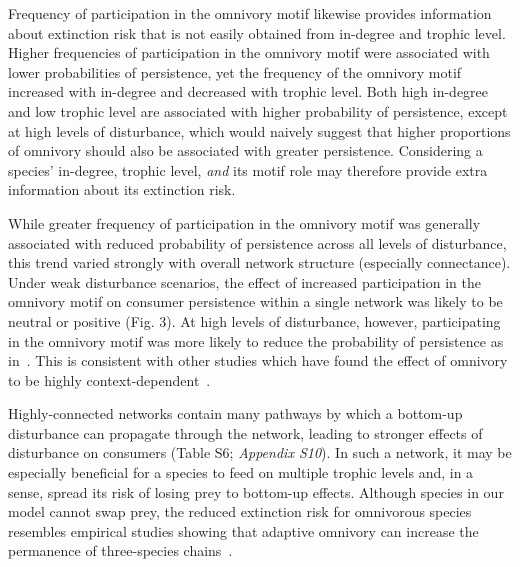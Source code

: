 \documentclass[12pt]{article}
\begin{document}
\begin{spacing}{2.0}
    
    Frequency of participation in the omnivory motif likewise provides information about extinction risk that is not easily obtained from in-degree and trophic level.
    Higher frequencies of participation in the omnivory motif were associated with lower probabilities of persistence, yet the frequency of the omnivory motif increased with in-degree and decreased with trophic level.
    Both high in-degree and low trophic level are associated with higher probability of persistence, except at high levels of disturbance, which would naively suggest that higher proportions of omnivory should also be associated with greater persistence. 
    Considering a species' in-degree, trophic level, \emph{and} its motif role may therefore provide extra information about its extinction risk.
    
  
    While greater frequency of participation in the omnivory motif was generally associated with reduced probability of persistence across all levels of disturbance, this trend varied strongly with overall network structure (especially connectance).
    Under weak disturbance scenarios, the effect of increased participation in the omnivory motif on consumer persistence within a single network was likely to be neutral or positive (Fig. 3). 
    At high levels of disturbance, however, participating in the omnivory motif was more likely to reduce the probability of persistence as in~\citet{McLeod2021}.
    This is consistent with other studies which have found the effect of omnivory to be highly context-dependent~\citep{bascompte2005simple, Monteiro2016}.
    

    Highly-connected networks contain many pathways by which a bottom-up disturbance can propagate through the network, leading to stronger effects of disturbance on consumers (Table S6; \emph{Appendix S10}).
    In such a network, it may be especially beneficial for a species to feed on multiple trophic levels and, in a sense, spread its risk of losing prey to bottom-up effects.
    Although species in our model cannot swap prey, the reduced extinction risk for omnivorous species resembles empirical studies showing that adaptive omnivory can increase the permanence of three-species chains~\citep{Fagan1997, Kvrivan2005, AbramsFung2010}.  


\end{spacing}
\end{document}
